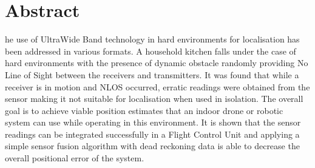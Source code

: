 %
%
%

\chapter*{Abstract}
\begin{SingleSpace}
he use of UltraWide Band technology in hard environments for localisation has been addressed in various formats.
    A household kitchen falls under the case of hard environments with the presence of dynamic obstacle randomly providing No Line of Sight between the receivers and transmitters.
    It was found that while a receiver is in motion and NLOS occurred, erratic readings were obtained from the sensor making it not suitable for localisation when used in isolation.
    The overall goal is to achieve viable position estimates that an indoor drone or robotic system can use while operating in this environment.
    It is shown that the sensor readings can be integrated successfully in a Flight Control Unit and applying a simple sensor fusion algorithm with dead reckoning data is able to decrease the overall positional error of the system.
\end{SingleSpace}
\clearpage